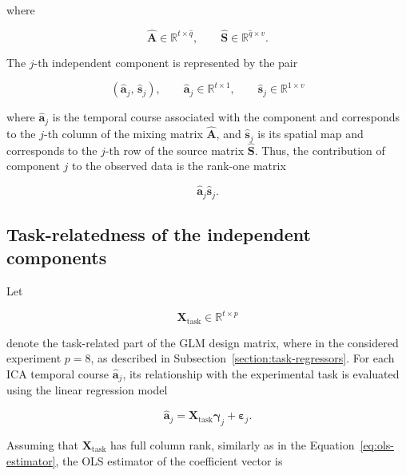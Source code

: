\documentclass[english]{pwr_wmat_praca_dyplomowa}
\theoremstyle{definition}
\theoremstyle{remark}
\begin{document}
where

\begin{equation}
    \widehat{\mathbf{A}} \in \mathbb{R}^{t \times \widehat{q}},
    \qquad
    \widehat{\mathbf{S}} \in \mathbb{R}^{\widehat{q} \times v}.
\end{equation}

The $j$-th independent component is represented by the pair

\begin{equation}
    \left(\widehat{\mathbf{a}}_j, \, \widehat{\mathbf{s}}_j \right), \qquad
    \widehat{\mathbf{a}}_j \in \mathbb{R}^{t \times 1}, \qquad
    \widehat{\mathbf{s}}_j \in \mathbb{R}^{1 \times v}
\end{equation}

where $\widehat{\mathbf{a}}_j$ is the temporal course associated with the component and corresponds to the $j$-th column of the mixing matrix $\widehat{\mathbf{A}}$, and $\widehat{\mathbf{s}}_j$ is its spatial map and corresponds to the $j$-th row of the source matrix $\widehat{\mathbf{S}}$. Thus, the contribution of component $j$ to the observed data is the rank-one matrix

\begin{equation}
    \widehat{\mathbf{a}}_j \widehat{\mathbf{s}}_j.
\end{equation}

\subsection{Task-relatedness of the independent components}

Let

\begin{equation}
    \mathbf{X}_{\mathrm{task}} \in \mathbb{R}^{t \times p}
\end{equation}

denote the task-related part of the GLM design matrix, where in the considered experiment $p=8$, as described in Subsection~\ref{section:task-regressors}. For each ICA temporal course $\widehat{\mathbf{a}}_j$, its relationship with the experimental task is evaluated using the linear regression model

\begin{equation}
    \widehat{\mathbf{a}}_j = \mathbf{X}_{\mathrm{task}} \boldsymbol{\gamma}_j + \boldsymbol{\varepsilon}_j.
\end{equation}

\newpage
Assuming that $\mathbf{X}_{\mathrm{task}}$ has full column rank, similarly as in the Equation~\eqref{eq:ols-estimator}, the OLS estimator of the coefficient vector is
\end{document}
